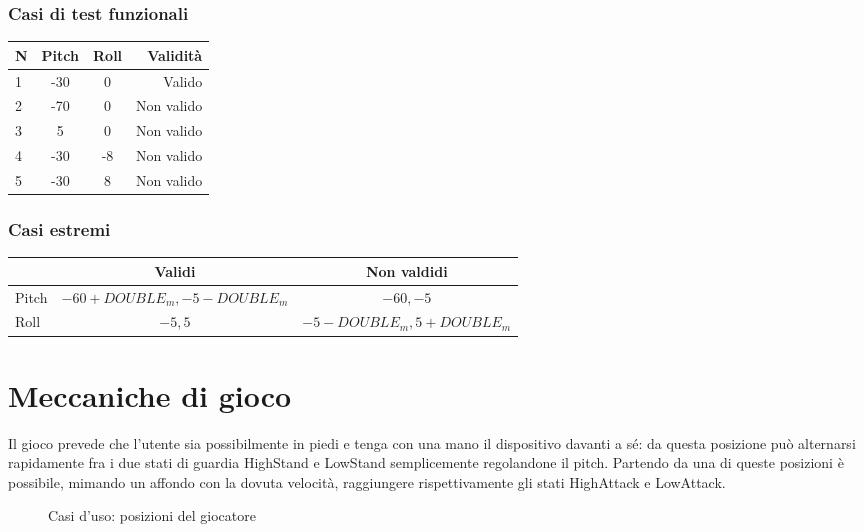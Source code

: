 \documentclass[a4paper,11pt]{article}
\begin{document}
\subsubsection{Casi di test funzionali}
\begin{tabular}{  l|*{2}{c}|r  }
N & Pitch & Roll & Validità\\
\hline
1 & -30 & 0 & Valido\\
2 & -70 & 0 & Non valido\\
3 & 5 & 0 & Non valido\\
4 & -30 & -8 & Non valido\\
5 & -30 & 8 & Non valido\\
\end{tabular}
\subsubsection{Casi estremi}
\begin{tabular}{ l c | c }
 & Validi & Non valdidi\\
\hline
Pitch & {$-60 + DOUBLE_m , -5 - DOUBLE_m$} &  {$-60, -5$}\\
\hline
Roll & {$-5, 5$} & {$-5 - DOUBLE_m, 5 + DOUBLE_m$}\\
\end{tabular}
\newpage

\section{Meccaniche di gioco}
Il gioco prevede che l'utente sia possibilmente in piedi e tenga con una mano il dispositivo davanti a sé: da questa posizione può alternarsi rapidamente fra i due stati di guardia HighStand e LowStand semplicemente regolandone il pitch.
Partendo da una di queste posizioni è possibile, mimando un affondo con la dovuta velocità, raggiungere rispettivamente gli stati HighAttack e LowAttack.
\begin{figure}[h]
\caption{Casi d'uso: posizioni del giocatore}
\noindent{}
\end{figure}
\end{document}
